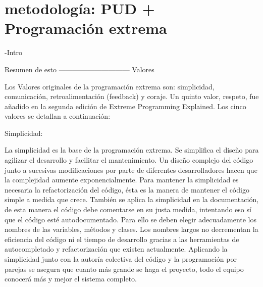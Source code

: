 \documentclass[12 pt, a4paper, twoside]{article}
\begin{document}










\section{metodología: PUD + Programación extrema}

-Intro


Resumen de esto ------------------------------
Valores

Los Valores originales de la programación extrema son: simplicidad, comunicación, retroalimentación (feedback) y coraje. Un quinto valor, respeto, fue añadido en la segunda edición de Extreme Programming Explained. Los cinco valores se detallan a continuación:

    Simplicidad:

La simplicidad es la base de la programación extrema. Se simplifica el diseño para agilizar el desarrollo y facilitar el mantenimiento. Un diseño complejo del código junto a sucesivas modificaciones por parte de diferentes desarrolladores hacen que la complejidad aumente exponencialmente. Para mantener la simplicidad es necesaria la refactorización del código, ésta es la manera de mantener el código simple a medida que crece. También se aplica la simplicidad en la documentación, de esta manera el código debe comentarse en su justa medida, intentando eso sí que el código esté autodocumentado. Para ello se deben elegir adecuadamente los nombres de las variables, métodos y clases. Los nombres largos no decrementan la eficiencia del código ni el tiempo de desarrollo gracias a las herramientas de autocompletado y refactorización que existen actualmente. Aplicando la simplicidad junto con la autoría colectiva del código y la programación por parejas se asegura que cuanto más grande se haga el proyecto, todo el equipo conocerá más y mejor el sistema completo.
\end{document}
